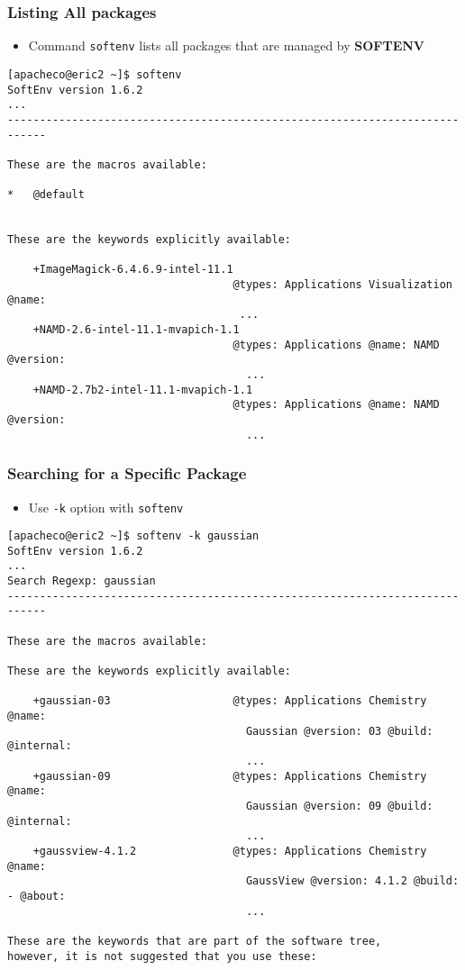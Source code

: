 \documentclass[slidestop,mathserif,compress,xcolor=svgnames,table]{beamer}
\begin{document}
\begin{frame}[fragile]
  \frametitle{\small Listing All packages}
  \begin{itemize}
    \item Command \texttt{softenv} lists all packages that are managed by {\bf SOFTENV}
  \end{itemize}
  {\tiny
  \begin{alertblock}{}
    \begin{verbatim}
[apacheco@eric2 ~]$ softenv
SoftEnv version 1.6.2
...
----------------------------------------------------------------------------

These are the macros available:

*   @default                      


These are the keywords explicitly available:

    +ImageMagick-6.4.6.9-intel-11.1
                                   @types: Applications Visualization @name:
                                    ...
    +NAMD-2.6-intel-11.1-mvapich-1.1
                                   @types: Applications @name: NAMD @version:
                                     ...
    +NAMD-2.7b2-intel-11.1-mvapich-1.1
                                   @types: Applications @name: NAMD @version:
                                     ...
    \end{verbatim}
  \end{alertblock}
  }
\end{frame}

\begin{frame}[fragile]
  \frametitle{\small Searching for a Specific Package}
  \begin{itemize}
    \item Use \texttt{-k} option with \texttt{softenv}
  \end{itemize}
  {\tiny
  \begin{alertblock}{}
    \begin{verbatim}
[apacheco@eric2 ~]$ softenv -k gaussian
SoftEnv version 1.6.2
...
Search Regexp: gaussian
----------------------------------------------------------------------------

These are the macros available:

These are the keywords explicitly available:

    +gaussian-03                   @types: Applications Chemistry @name:
                                     Gaussian @version: 03 @build: @internal:
                                     ...
    +gaussian-09                   @types: Applications Chemistry @name:
                                     Gaussian @version: 09 @build: @internal:
                                     ...
    +gaussview-4.1.2               @types: Applications Chemistry @name:
                                     GaussView @version: 4.1.2 @build: - @about:
                                     ...

These are the keywords that are part of the software tree,
however, it is not suggested that you use these:
    \end{verbatim}
  \end{alertblock}
  }
\end{frame}
\end{document}
